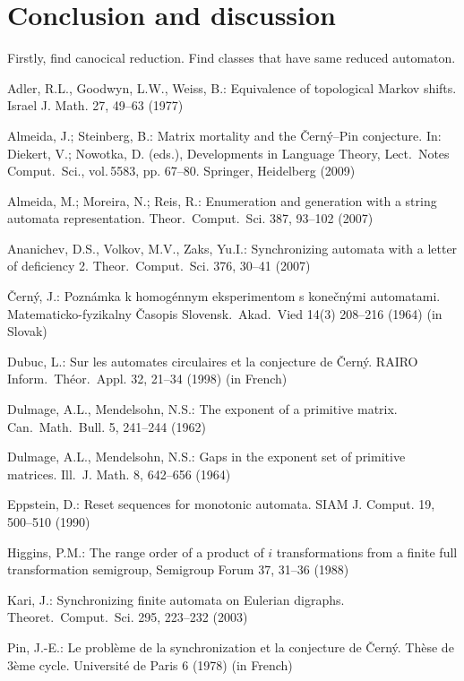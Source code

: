 \documentclass[11pt]{llncs}
\begin{document}
\section{Conclusion and discussion}
Firstly, find canocical reduction. Find classes that have same reduced automaton.

\begin{thebibliography}{99}
Adler, R.L., Goodwyn, L.W., Weiss, B.: Equivalence of topological Markov shifts.
Israel J. Math. 27, 49--63 (1977)

Almeida, J.; Steinberg, B.: Matrix mortality and the \v{C}ern\'{y}--Pin
conjecture. In:  Diekert, V.; Nowotka, D. (eds.), Developments in
Language Theory, Lect.\ Notes Comput.\ Sci., vol.\,5583, pp. 67--80.
Springer, Heidelberg (2009)

Almeida, M.; Moreira, N.; Reis, R.: Enumeration and generation with a string
automata representation. Theor.\ Comput.\ Sci. 387, 93--102 (2007)

Ananichev, D.S., Volkov, M.V., Zaks, Yu.I.: Synchronizing automata
with a letter of deficiency 2. Theor.\ Comput.\ Sci. 376, 30--41 (2007)

\v{C}ern\'{y}, J.: Pozn\'{a}mka k homog\'{e}nnym eksperimentom s
kone\v{c}n\'{y}mi automatami. Matematicko-fyzikalny \v{C}asopis
Slovensk.\ Akad.\ Vied 14(3) 208--216 (1964) (in Slovak)

Dubuc, L.: Sur les automates circulaires et la conjecture de
\v{C}ern\'y. RAIRO Inform.\ Th\'eor.\ Appl. 32, 21--34 (1998) (in
French)

Dulmage, A.L., Mendelsohn, N.S.: The exponent of a primitive matrix.
Can.\ Math.\ Bull. 5, 241--244 (1962)

Dulmage, A.L., Mendelsohn, N.S.: Gaps in the exponent set of primitive
matrices. Ill.\ J. Math. 8, 642--656 (1964)

Eppstein, D.: Reset sequences for monotonic automata. SIAM J.
Comput. 19, 500--510 (1990)

Higgins, P.M.: The range order of a product of $i$ transformations
from a finite full transformation semigroup, Semigroup Forum 37, 31--36
(1988)

Kari, J.: Synchronizing finite automata on Eulerian digraphs.
Theoret.\ Comput.\ Sci. 295, 223--232 (2003)

Pin, J.-E.: Le probl\`eme de la synchronization et la conjecture de
\v{C}ern\'y. Th\`ese de 3\`eme cycle. Universit\'e de Paris 6 (1978) (in
French)


\end{thebibliography}
\end{document}
